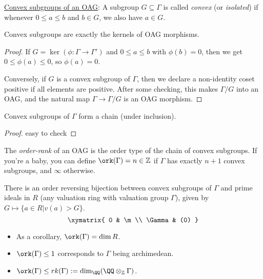  \underline{Convex subgroups of an OAG}: A subgroup $G\subseteq \Gamma$ is called
 \emph{convex} (or \emph{isolated}) if whenever $0\le a\le b$ and $b\in G$, we also have
 $a\in G$.
 \begin{theorem}
   Convex subgroups are exactly the kernels of OAG morphisms.
 \end{theorem}
 \begin{proof}
   If $G=\ker (\phi:\Gamma\to \Gamma')$ and $0\le a\le b$ with $\phi(b)=0$, then we get
   $0\le \phi(a)\le 0$, so $\phi(a)=0$.

   Conversely, if $G$ is a convex subgroup of $\Gamma$, then we declare a non-identity
   coset positive if all elements are positive. After some checking, this makes
   $\Gamma/G$ into an OAG, and the natural map $\Gamma\to \Gamma/G$ is an OAG morphism.
   \anton{}
 \end{proof}
 \begin{lemma}
   Convex subgroups of $\Gamma$ form a chain (under inclusion).
 \end{lemma}
 \begin{proof}
   easy to check \anton{}
 \end{proof}
 \begin{definition}
   The \emph{order-rank} of an OAG is the order type of the chain of convex subgroups. If
   you're a baby, you can define $\ork(\Gamma)=n\in \mathbb{Z}$ if $\Gamma$ has exactly
   $n+1$ convex subgroups, and $\infty$ otherwise.
 \end{definition}
 There is an order reversing bijection between convex subgroups of $\Gamma$ and prime
 ideals in $R$ (any valuation ring with valuation group $\Gamma$), given by $G\mapsto
 \{a\in R|v(a)>G\}$.
 \[\xymatrix{
 0 & \m\\
 \Gamma & (0)
 }\]
 \begin{itemize}
   \item As a corollary, $\ork(\Gamma)=\dim R$.
   \item $\ork(\Gamma)\le 1$ corresponds to $\Gamma$ being archimedean.
   \item $\ork(\Gamma)\le rk(\Gamma) := \dim_\QQ(\QQ\otimes_\mathbb{Z} \Gamma)$.
 \end{itemize}


